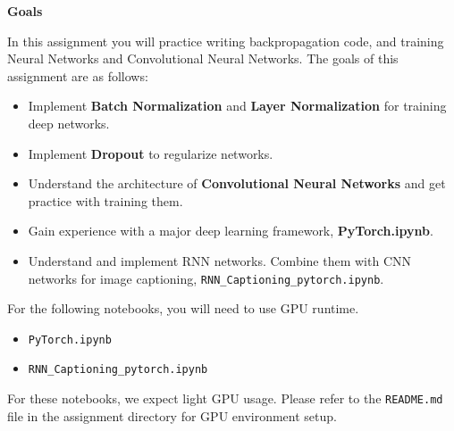 \textbf{Goals}

In this assignment you will practice writing backpropagation code, and training Neural Networks and Convolutional Neural Networks. The goals of this assignment are as follows:

\begin{itemize}
    \item Implement \textbf{Batch Normalization} and \textbf{Layer Normalization} for training deep networks.
    \item Implement \textbf{Dropout} to regularize networks.
    \item Understand the architecture of \textbf{Convolutional Neural Networks} and get practice with training them.
    \item Gain experience with a major deep learning framework, \textbf{PyTorch.ipynb}.
    \item Understand and implement RNN networks. Combine them with CNN networks for image captioning, \texttt{RNN\_Captioning\_pytorch.ipynb}.
\end{itemize}


For the following notebooks, you will need to use GPU runtime.
\begin{itemize}
    \item \texttt{PyTorch.ipynb}
    \item \texttt{RNN\_Captioning\_pytorch.ipynb}
\end{itemize}

For these notebooks, we expect light GPU usage. Please refer to the \texttt{README.md} file in the assignment directory for GPU environment setup.




\newpage